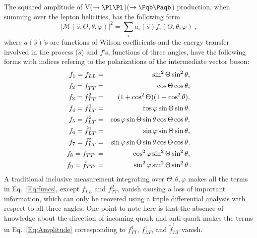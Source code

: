 \documentclass[a4paper,11pt]{article}
\newcommand{\Pb}{{{\Pqb}}\xspace}
\newcommand{\PAb}{{{{\Paqb}}}\xspace}
\renewcommand{\PV}{{{{V}}}\xspace}
\begin{document}
The squared amplitude of \PV($\to \Pl \Pl$)\PH($\to \Pb \PAb$) production, when summing over the lepton helicities, has the following form
\begin{equation}
	|\mathcal{M} \left(\hat{s}, \Theta, \theta, \varphi \right)|^{2} = {\sum}_{i} a_i \left(\hat{s}\right) f_i \left(\Theta, \theta, \varphi \right) \ ,
\label{Eq:Amplitude}
\end{equation}
where $a \left(\hat{s}\right)$'s are functions of Wilson coefficients and the energy transfer involved in the process ($\hat{s}$) and $f$'s, functions of three angles, have the following forms with indices refering to the polarizations of the intermediate vector boson:
\begin{eqnarray}
    f_{1} = f_{LL} &=& \sin^{2}\Theta \sin^{2}\theta,{\nonumber}\\
    f_{2} = f^1_{TT} &=& \cos\Theta \cos\theta,{\nonumber}\\
    f_{3} = f^2_{TT} &=& (1+\cos^{2}\Theta)(1+ \cos^{2}\theta),{\nonumber}\\
    f_{4} = f^1_{LT} &=& \cos\varphi \sin\Theta \sin\theta,{\nonumber}\\
    f_{5} = f^2_{LT} &=& \cos\varphi \sin\Theta \sin\theta \cos\Theta \cos\theta,{\nonumber}\\
    f_{6} = \tilde{f}^1_{LT} &=& \sin\varphi \sin\Theta \sin\theta, {\nonumber}\\
    f_{7} = \tilde{f}^2_{LT} &=& \sin\varphi \sin\Theta \sin\theta \cos\Theta \cos\theta,{\nonumber}\\
    f_{8} = f_{TT'} &=& \cos^{2}\varphi \sin^{2}{\Theta} \sin^{2}{\theta},{\nonumber}\\
    f_{9} = \tilde{f}_{TT'} &=&  \sin^{2}{\varphi} \sin^{2}{\Theta} \sin^{2}{\theta}\,	.
    \label{Eq:funcs}
\end{eqnarray}
A traditional inclusive measurement integrating over $\Theta, \theta, \varphi$ makes all the terms in Eq.~\eqref{Eq:funcs}, except $f_{LL}$ and $f^2_{TT}$, vanish causing a loss of important information, which can only be reovered using a triple differential analysis with respect to all three angles.
One point to note here is that the absence of knowledge about the direction of incoming quark and anti-quark makes the terms in Eq.~\eqref{Eq:Amplitude} corresponding to $f^1_{TT}$, $f^1_{LT}$, and $\tilde{f}^1_{LT}$ vanish.
\end{document}
